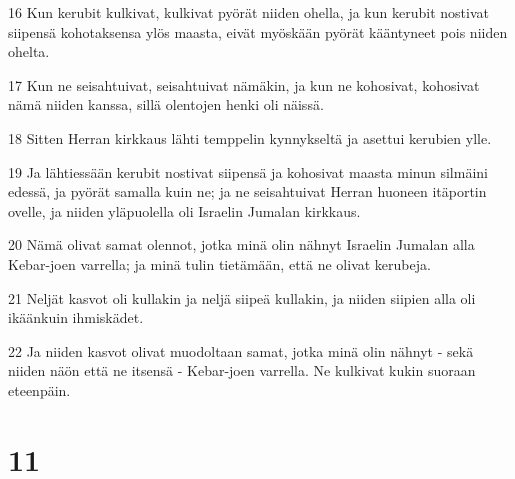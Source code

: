\par 16 Kun kerubit kulkivat, kulkivat pyörät niiden ohella, ja kun kerubit nostivat siipensä kohotaksensa ylös maasta, eivät myöskään pyörät kääntyneet pois niiden ohelta.
\par 17 Kun ne seisahtuivat, seisahtuivat nämäkin, ja kun ne kohosivat, kohosivat nämä niiden kanssa, sillä olentojen henki oli näissä.
\par 18 Sitten Herran kirkkaus lähti temppelin kynnykseltä ja asettui kerubien ylle.
\par 19 Ja lähtiessään kerubit nostivat siipensä ja kohosivat maasta minun silmäini edessä, ja pyörät samalla kuin ne; ja ne seisahtuivat Herran huoneen itäportin ovelle, ja niiden yläpuolella oli Israelin Jumalan kirkkaus.
\par 20 Nämä olivat samat olennot, jotka minä olin nähnyt Israelin Jumalan alla Kebar-joen varrella; ja minä tulin tietämään, että ne olivat kerubeja.
\par 21 Neljät kasvot oli kullakin ja neljä siipeä kullakin, ja niiden siipien alla oli ikäänkuin ihmiskädet.
\par 22 Ja niiden kasvot olivat muodoltaan samat, jotka minä olin nähnyt - sekä niiden näön että ne itsensä - Kebar-joen varrella. Ne kulkivat kukin suoraan eteenpäin.

\chapter{11}

